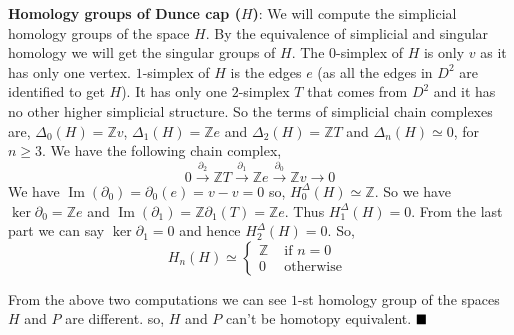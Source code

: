 \documentclass[11pt]{article}
\newcommand{\bb}[1]{\mathbb{#1}}
\newcommand{\Z}{\bb{Z}}
\newcommand{\p}{\partial}
\newcommand{\D}{\Delta}
\begin{document}
  \vspace*{0.2cm}

\noindent \textbf{\textsf{Homology groups of Dunce cap ($H$)}}:
 We will compute the simplicial homology groups of the space $H$. By the equivalence of simplicial and singular homology we will get the singular groups of $H$. The $0$-simplex of $H$ is only $v$ as it has only one vertex. $1$-simplex of $H$ is the edges $e$ (as all the edges in $D^2$ are identified to get $H$). It has only one $2$-simplex $T$ that comes from $D^2$ and it has no other higher simplicial structure. So the terms of simplicial chain complexes are, $\D_0(H) = \Z v$, $\D_1(H) = \Z e$ and $\D_2(H)= \Z T$ and $\D_n(H) \simeq 0$, for $n \geq 3$. We have the following chain complex, $$0 \xrightarrow{\p_2} \Z T \xrightarrow{\p_1}\Z e \xrightarrow{\p_0} \Z v \xrightarrow{} 0$$ We have $\operatorname{Im} (\p_0)= \p_0 (e) = v-v =0$ so, $H_0^{\D} (H) \simeq \Z$. So we have $\ker \p_0 = \Z e$ and $\operatorname{Im}(\p_1) = \Z \p_1(T) = \Z e$. Thus $H_1^{\D}(H) = 0$. From the last part we can say $\ker \p_1 = 0$ and hence $H_2^{\D} (H)=0$. So, $$H_n(H) \simeq \begin{cases}
   \Z & \text{ if } n= 0 \\
   0 &  \text{ otherwise }
 \end{cases}$$

\vspace*{0.2cm}

\noindent From the above two computations we can see $1$-st homology group of the spaces $H$ and $P$ are different. so, $H$ and $P$ can't be homotopy equivalent. $\hfill \blacksquare$
\end{document}
